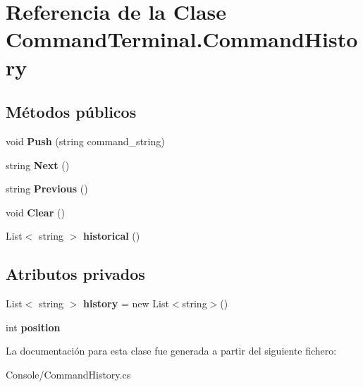 \hypertarget{class_command_terminal_1_1_command_history}{}\section{Referencia de la Clase Command\+Terminal.\+Command\+History}
\label{class_command_terminal_1_1_command_history}
\subsection*{Métodos públicos}
\begin{DoxyCompactItemize}
\item 
\mbox{\label{class_command_terminal_1_1_command_history_a468cb902b41754b3e754e87b64604dd8}} 
void {\bfseries Push} (string command\+\_\+string)
\item 
\mbox{\label{class_command_terminal_1_1_command_history_a327941f014bc3b59b59a0aab9fbd41c8}} 
string {\bfseries Next} ()
\item 
\mbox{\label{class_command_terminal_1_1_command_history_a96c5dbea923ca72fd0e2f400baa681c4}} 
string {\bfseries Previous} ()
\item 
\mbox{\label{class_command_terminal_1_1_command_history_a5882c8ea71e4799986a8aea0cf4fd1e7}} 
void {\bfseries Clear} ()
\item 
\mbox{\label{class_command_terminal_1_1_command_history_aa67f82a3aacf47ce9396178fac60dd40}} 
List$<$ string $>$ {\bfseries historical} ()
\end{DoxyCompactItemize}
\subsection*{Atributos privados}
\begin{DoxyCompactItemize}
\item 
\mbox{\label{class_command_terminal_1_1_command_history_aab1e1ba7805ed628f2ad525f20caa880}} 
List$<$ string $>$ {\bfseries history} = new List$<$string$>$()
\item 
\mbox{\label{class_command_terminal_1_1_command_history_ad48d62138b533a906b979c538b1b89cb}} 
int {\bfseries position}
\end{DoxyCompactItemize}


La documentación para esta clase fue generada a partir del siguiente fichero\+:\begin{DoxyCompactItemize}
\item 
Console/Command\+History.\+cs\end{DoxyCompactItemize}
